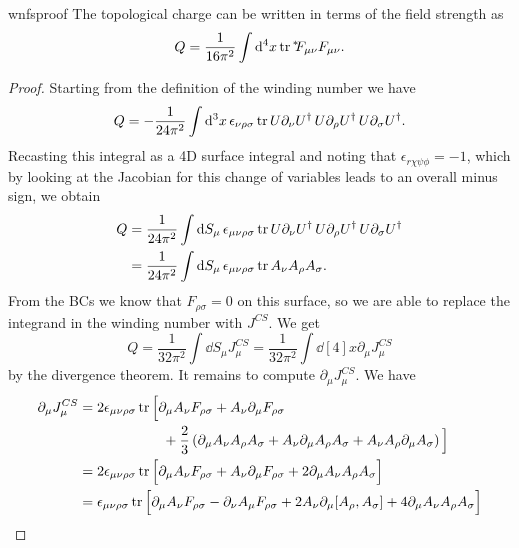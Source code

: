 \begin{proposition}{}{wnfsproof}
The topological charge can be written in terms of the field strength as
$$
  Q=\frac{1}{16\pi^2}\int\dd[4]{x}\tr\dual{F_{\mu\nu}}F_{\mu\nu}.
$$
  \begin{proof} Starting from the definition of the winding number we have
    $$
      Q=-\frac{1}{24\pi^2}\int\dd[3]{x}
        \epsilon_{\nu\rho\sigma}\tr U\partial_\nu U^\dagger\,
        U\partial_\rho U^\dagger\,U\partial_\sigma U^\dagger.
    $$
    Recasting this integral as a 4D surface integral and noting
    that $\epsilon_{r\chi\psi\phi}=-1$, which by looking at the Jacobian
    for this change of variables leads to an overall minus sign, we obtain
   \begin{equation*}\begin{aligned}
      Q&=\frac{1}{24\pi^2}\int\dd{S_\mu}
        \epsilon_{\mu\nu\rho\sigma}\tr U\partial_\nu U^\dagger\,
        U\partial_\rho U^\dagger\,U\partial_\sigma U^\dagger\\
       &=\frac{1}{24\pi^2}\int\dd{S_\mu}
        \epsilon_{\mu\nu\rho\sigma}\tr A_\nu A_\rho A_\sigma.
    \end{aligned}\end{equation*}
    From the BCs we know that $F_{\rho\sigma}=0$ on this surface, so
    we are able to replace the integrand in the winding number
    with $J^{CS}$. We get
    $$
      Q=\frac{1}{32\pi^2}\int\dd{S_\mu}J_\mu^{CS}
       =\frac{1}{32\pi^2}\int\dd[4]{x}\partial_\mu J_\mu^{CS}
    $$
    by the divergence theorem.
    It remains to compute $\partial_\mu J_\mu^{CS}$. We have
    \begin{equation*}
    \begin{aligned}
      \partial_\mu J_\mu^{CS}
       &=2\epsilon_{\mu\nu\rho\sigma}\tr\Big[\partial_\mu A_\nu F_{\rho\sigma}
           +A_\nu\partial_\mu F_{\rho\sigma}\\
       &~~~~~~~~~~~~~~~~~~+\frac{2}{3}\left(\partial_\mu A_\nu A_\rho A_\sigma
              +A_\nu \partial_\mu A_\rho A_\sigma
              +A_\nu A_\rho \partial_\mu A_\sigma\right)\Big]\\
       &=2\epsilon_{\mu\nu\rho\sigma}\tr\Big[\partial_\mu A_\nu F_{\rho\sigma}
           +A_\nu\partial_\mu F_{\rho\sigma}
           +2\partial_\mu A_\nu A_\rho A_\sigma\Big]\\ 
      &=\epsilon_{\mu\nu\rho\sigma}\tr\Big[\partial_\mu A_\nu F_{\rho\sigma}
           -\partial_\nu A_\mu F_{\rho\sigma}
           +2A_\nu\partial_\mu[A_\rho,A_\sigma]
           +4\partial_\mu A_\nu A_\rho A_\sigma\Big]\\

\end{aligned}
\end{equation*}
\end{proof}
\end{proposition}
